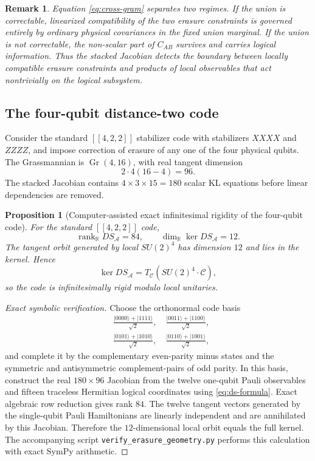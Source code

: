 \documentclass[11pt]{article}
\newtheorem{proposition}[theorem]{Proposition}
\newtheorem{remark}[theorem]{Remark}
\theoremstyle{definition}
\newcommand{\cC}{\mathcal C}
\newcommand{\Gr}{\operatorname{Gr}}
\newcommand{\rank}{\operatorname{rank}}
\newcommand{\R}{\mathbb R}
\newcommand{\1}{\mathbf 1}
\newcommand{\ket}[1]{\lvert #1\rangle}
\begin{document}
\begin{remark}
Equation \eqref{eq:cross-gram} separates two regimes.  If the union is correctable, linearized compatibility of the two erasure constraints is governed entirely by ordinary physical covariances in the fixed union marginal.  If the union is not correctable, the non-scalar part of $C_{AB}$ survives and carries logical information.  Thus the stacked Jacobian detects the boundary between locally compatible erasure constraints and products of local observables that act nontrivially on the logical subsystem.
\end{remark}

\subsection{The four-qubit distance-two code}

Consider the standard $[[4,2,2]]$ stabilizer code with stabilizers $XXXX$ and $ZZZZ$, and impose correction of erasure of any one of the four physical qubits.  The Grassmannian is $\Gr(4,16)$, with real tangent dimension
\[
2\cdot4(16-4)=96.
\]
The stacked Jacobian contains $4\times 3\times 15=180$ scalar KL equations before linear dependencies are removed.

\begin{proposition}[Computer-assisted exact infinitesimal rigidity of the four-qubit code]
\label{prop:422}
For the standard $[[4,2,2]]$ code,
\[
\rank_{\R}DS_{\mathcal A}=84,
\qquad
\dim_{\R}\ker DS_{\mathcal A}=12.
\]
The tangent orbit generated by local $SU(2)^4$ has dimension $12$ and lies in the kernel.  Hence
\begin{equation}
\ker DS_{\mathcal A}
=
T_{\cC}(SU(2)^4\cdot\cC),
\label{eq:422-rigid}
\end{equation}
so the code is infinitesimally rigid modulo local unitaries.
\end{proposition}

\begin{proof}[Exact symbolic verification]
Choose the orthonormal code basis
\begin{align*}
&\frac{\ket{0000}+\ket{1111}}{\sqrt2},\quad
\frac{\ket{0011}+\ket{1100}}{\sqrt2},\\
&\frac{\ket{0101}+\ket{1010}}{\sqrt2},\quad
\frac{\ket{0110}+\ket{1001}}{\sqrt2},
\end{align*}
and complete it by the complementary even-parity minus states and the symmetric and antisymmetric complement-pairs of odd parity.  In this basis, construct the real $180\times96$ Jacobian from the twelve one-qubit Pauli observables and fifteen traceless Hermitian logical coordinates using \eqref{eq:ds-formula}.  Exact algebraic row reduction gives rank $84$.  The twelve tangent vectors generated by the single-qubit Pauli Hamiltonians are linearly independent and are annihilated by this Jacobian.  Therefore the $12$-dimensional local orbit equals the full kernel.  The accompanying script \texttt{verify\_erasure\_geometry.py} performs this calculation with exact SymPy arithmetic.
\end{proof}
\end{document}
